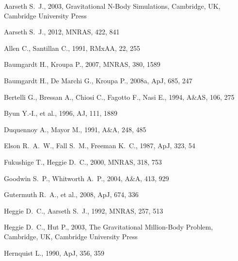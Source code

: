 \documentclass[useAMS,usenatbib]{mn2e}
\begin{document}
\begin{thebibliography}{99}

Aarseth S.~J., 2003, Gravitational N-Body Simulations, Cambridge, UK, Cambridge University Press

Aarseth S.~J., 2012, MNRAS, 422, 841 

Allen C., Santillan C., 1991, RMxAA, 22, 255

Baumgardt H., Kroupa P., 2007, MNRAS, 380, 1589 

Baumgardt H., De Marchi G., Kroupa P., 2008a, ApJ, 685, 247

Bertelli G., Bressan A., Chiosi C., Fagotto F., Nasi E., 1994, A\&AS, 106, 275

Byun Y.-I., et al., 1996, AJ, 111, 1889

Duquennoy A., Mayor M., 1991, A\&A, 248, 485 

Elson R.~A.~W., Fall S.~M., Freeman K.~C., 1987, ApJ, 323, 54 

Fukushige T., Heggie D.~C., 2000, MNRAS, 318, 753

Goodwin S.~P., Whitworth A.~P., 2004, A\&A, 413, 929

Gutermuth R.~A., et al., 2008, ApJ, 674, 336 

Heggie D.~C., Aarseth S.~J., 1992, MNRAS, 257, 513

Heggie D.~C., Hut P., 2003, The Gravitational Million-Body Problem, Cambridge, UK, Cambridge University Press

Hernquist L., 1990, ApJ, 356, 359


\end{thebibliography}
\end{document}
